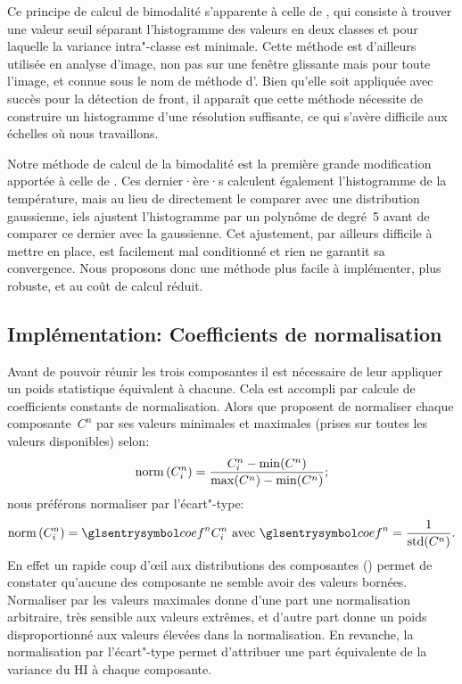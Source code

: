 Ce principe de calcul de bimodalité s'apparente à celle de \textcite{cayula_1992}, qui consiste à trouver une valeur seuil séparant l'histogramme des valeurs en deux classes et pour laquelle la variance intra"-classe est minimale.
Cette méthode est d'ailleurs utilisée en analyse d'image, non pas sur une fenêtre glissante mais pour toute l'image, et connue sous le nom de méthode d'\textcite{otsu_1979}.
Bien qu'elle soit appliquée avec succès pour la détection de front, il apparaît que cette méthode nécessite de construire un histogramme d'une résolution suffisante, ce qui s'avère difficile aux échelles où nous travaillons.

Notre méthode de calcul de la bimodalité est la première grande modification apportée à celle de \textcite{liu_2016}.
Ces dernier·ère·s calculent également l'histogramme de la température, mais au lieu de directement le comparer avec une distribution gaussienne, iels ajustent l'histogramme par un polynôme de degré~5 avant de comparer ce dernier avec la gaussienne.
Cet ajustement, par ailleurs difficile à mettre en place, est facilement mal conditionné et rien ne garantit sa convergence.
Nous proposons donc une méthode plus facile à implémenter, plus robuste, et au coût de calcul réduit.

\subsection{Implémentation: Coefficients de normalisation}
\label{sec:coef-normalisation}

Avant de pouvoir réunir les trois composantes il est nécessaire de leur appliquer un poids statistique équivalent à chacune. Cela est accompli par calcule de coefficients constants de normalisation.
Alors que \citeauthor{liu_2016} proposent de normaliser chaque composante~\(C^n\) par ses valeurs minimales et maximales (prises sur toutes les valeurs disponibles) selon:
\begin{equation}
  \operatorname{norm}\left(C_i^n\right) = \frac {C_i^n - \min(C^n)} {\max(C^n) - \min(C^n)} ;
\end{equation}
nous préférons normaliser par l'écart"-type:
\begin{equation}
  \norm{C_i^n} = \am{coef}^n C_i^n
  \text{ avec } \am{coef}^n = \frac {1} {\std(C^n)} .
\end{equation}
En effet un rapide coup d’œil aux distributions des composantes () permet de constater qu'aucune des composante ne semble avoir des valeurs bornées.
Normaliser par les valeurs maximales donne d'une part une normalisation arbitraire, très sensible aux valeurs extrêmes, et d'autre part donne un poids disproportionné aux valeurs élevées dans la normalisation.
En revanche, la normalisation par l'écart"-type permet d'attribuer une part équivalente de la variance du HI à chaque composante.

